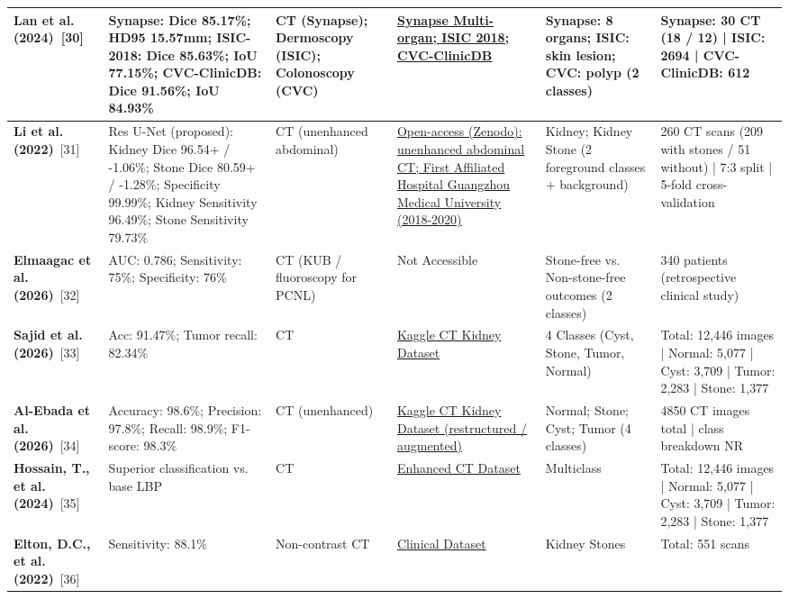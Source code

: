\documentclass{article}
\begin{document}
\begin{longtable}{|L{2.8cm}|L{2.5cm}|L{1.5cm}|L{3.5cm}|L{3.5cm}|L{4.5cm}|}
\hline
\textbf{Lan et al. (2024)}~[30] & Synapse: Dice 85.17\%; HD95 15.57mm; ISIC-2018: Dice 85.63\%; IoU 77.15\%; CVC-ClinicDB: Dice 91.56\%; IoU 84.93\% & CT (Synapse); Dermoscopy (ISIC); Colonoscopy (CVC) & \href{https://www.synapse.org/#!Synapse:syn3193805/wiki/217789}{Synapse Multi-organ; ISIC 2018; CVC-ClinicDB} & Synapse: 8 organs; ISIC: skin lesion; CVC: polyp (2 classes) & Synapse: 30 CT (18 / 12) | ISIC: 2694 | CVC-ClinicDB: 612 \\
\hline
\textbf{Li et al. (2022)}~[31] & Res U-Net (proposed): Kidney Dice 96.54+ / -1.06\%; Stone Dice 80.59+ / -1.28\%; Specificity 99.99\%; Kidney Sensitivity 96.49\%; Stone Sensitivity 79.73\% & CT (unenhanced abdominal) & \href{https://zenodo.org/record/6042410}{Open-access (Zenodo): unenhanced abdominal CT; First Affiliated Hospital Guangzhou Medical University (2018-2020)} & Kidney; Kidney Stone (2 foreground classes + background) & 260 CT scans (209 with stones / 51 without) | 7:3 split | 5-fold cross-validation \\
\hline
\textbf{Elmaagac et al. (2026)}~[32] & AUC: 0.786; Sensitivity: 75\%; Specificity: 76\% & CT (KUB / fluoroscopy for PCNL) & Not Accessible & Stone-free vs. Non-stone-free outcomes (2 classes) & 340 patients (retrospective clinical study) \\
\hline
\textbf{Sajid et al. (2026)}~[33] & Acc: 91.47\%; Tumor recall: 82.34\% & CT & \href{https://www.kaggle.com/datasets/nazmul0087/ct-kidney-dataset-normal-cyst-tumor-and-stone}{Kaggle CT Kidney Dataset} & 4 Classes (Cyst, Stone, Tumor, Normal) & Total: 12,446 images | Normal: 5,077 | Cyst: 3,709 | Tumor: 2,283 | Stone: 1,377 \\
\hline
\textbf{Al-Ebada et al. (2026)}~[34] & Accuracy: 98.6\%; Precision: 97.8\%; Recall: 98.9\%; F1-score: 98.3\% & CT (unenhanced) & \href{https://www.kaggle.com/datasets/nazmul0087/ct-kidney-dataset-normal-cyst-tumor-and-stone}{Kaggle CT Kidney Dataset (restructured / augmented)} & Normal; Stone; Cyst; Tumor (4 classes) & 4850 CT images total | class breakdown NR \\
\hline
\textbf{Hossain, T., et al. (2024)}~[35] & Superior classification vs. base LBP & CT & \href{https://www.kaggle.com/datasets/nazmul0087/ct-kidney-dataset-normal-cyst-tumor-and-stone}{Enhanced CT Dataset} & Multiclass & Total: 12,446 images | Normal: 5,077 | Cyst: 3,709 | Tumor: 2,283 | Stone: 1,377 \\
\hline
\textbf{Elton, D.C., et al. (2022)}~[36] & Sensitivity: 88.1\% & Non-contrast CT & \href{https://www.cancerimagingarchive.net/collection/ct-colonography/}{Clinical Dataset} & Kidney Stones & Total: 551 scans \\

\end{longtable}
\end{document}
